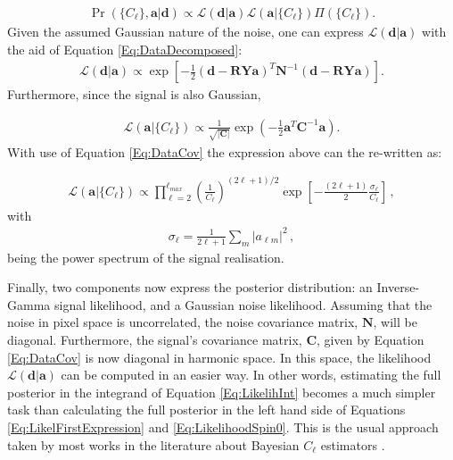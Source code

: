 \begin{align}
\Pr(\{C_{\ell}\},\mathbf{a}|\mathbf{d}) \propto \mathcal{L}(\mathbf{d}|\mathbf{a})\mathcal{L}(\mathbf{a}|\{C_{\ell}\})\Pi(\{C_{\ell}\}). 
\label{Eq:Posterior1}
\end{align}
\noindent Given the assumed Gaussian nature of the noise, one can express $\mathcal{L}(\mathbf{d}|\mathbf{a})$ with the aid of Equation \eqref{Eq:DataDecomposed}:
\begin{align}
\mathcal{L}(\mathbf{d}|\mathbf{a}) \propto \exp \left[ -\frac{1}{2} (\mathbf{d-RYa})^T \mathbf{N}^{-1}(\mathbf{d-RYa}) \right] .
\end{align}
\noindent Furthermore, since the signal is also Gaussian,

\begin{align}
\mathcal{L}(\mathbf{a}|\{C_{\ell}\}) \propto \frac{1}{\sqrt{|\mathbf{C}|}}\exp\left( -\frac{1}{2} \mathbf{a}^T\mathbf{C}^{-1}\mathbf{a}\right).
\end{align}
\noindent With use of Equation \eqref{Eq:DataCov} the expression above can the re-written as:

\begin{align}
\mathcal{L}(\mathbf{a}|\{C_{\ell}\}) \propto \prod_{{\ell}=2}^{{\ell}_{max}}\left(\frac{1}{C_{\ell}}\right)^{(2\ell+1)/2} \exp \left[ -\frac{(2\ell+1)}{2}\frac{\sigma_\ell}{C_{\ell}}\right]\, ,
\end{align}
\noindent with 
\begin{align}
\sigma_{\ell} = \frac{1}{2\ell+1}\sum_m|a_{\ell m}|^2 \, ,
\end{align}
\noindent being the power spectrum of the signal realisation.

\qquad Finally, two components now express the posterior distribution: an Inverse-Gamma signal likelihood, and a Gaussian noise likelihood. Assuming that the noise in pixel space is uncorrelated, the noise covariance matrix, $\mathbf{N}$, will be diagonal. Furthermore, the signal's covariance matrix, $\mathbf{C}$, given by Equation \eqref{Eq:DataCov} is now diagonal in harmonic space. In this space, the likelihood $ \mathcal{L}(\mathbf{d}|\mathbf{a} )$ can be computed in an easier way. In other words, estimating the full posterior in the integrand of Equation \eqref{Eq:LikelihInt} becomes a much simpler task than calculating the full posterior in the left hand side of Equations \eqref{Eq:LikelFirstExpression} and \eqref{Eq:LikelihoodSpin0}. This is the usual approach taken by most works in the literature about Bayesian $C_{\ell}$ estimators \citep{Taylor2008, SreeThesis}.


